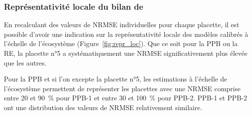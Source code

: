 %
%
%
%


\subsubsection{Représentativité locale du bilan de \coo}

En recalculant des valeurs de NRMSE individuelles pour chaque placette, il est possible d'avoir une indication sur la représentativité locale des modèles calibrés à l'échelle de l'écosystème (Figure~\ref{fig:repr_loc}).
Que ce soit pour la PPB ou la RE, la placette n°5 a systématiquement une NRMSE significativement plus élevée que les autres.

Pour la PPB et si l'on excepte la placette n°5, les estimations à l'échelle de l'écosystème permettent de représenter les placettes avec une NRMSE comprise entre 20 et \SI{90}{\percent} pour PPB-1 et entre 30 et \SI{100}{\percent} pour PPB-2.
PPB-1 et PPB-2 ont une distribution des valeurs de NRMSE relativement similaire.

